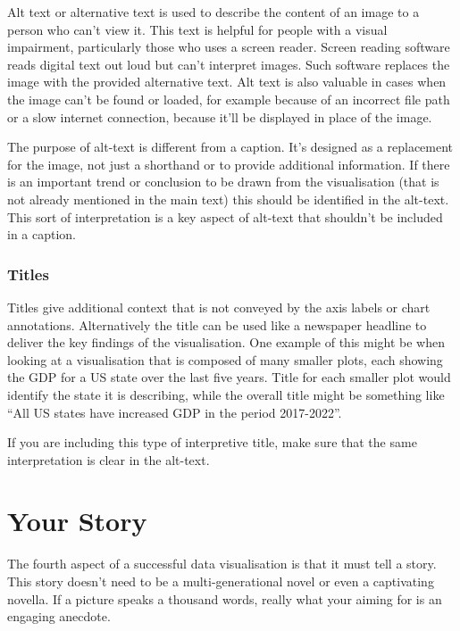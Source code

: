 \documentclass[
  12pt,
]{book}
\begin{document}
Alt text or alternative text is used to describe the content of an image to a person who can't view it. This text is helpful for people with a visual impairment, particularly those who uses a screen reader. Screen reading software reads digital text out loud but can't interpret images. Such software replaces the image with the provided alternative text. Alt text is also valuable in cases when the image can't be found or loaded, for example because of an incorrect file path or a slow internet connection, because it'll be displayed in place of the image.

The purpose of alt-text is different from a caption. It's designed as a replacement for the image, not just a shorthand or to provide additional information. If there is an important trend or conclusion to be drawn from the visualisation (that is not already mentioned in the main text) this should be identified in the alt-text. This sort of interpretation is a key aspect of alt-text that shouldn't be included in a caption.

\hypertarget{titles}{%
\subsubsection{Titles}\label{titles}}

Titles give additional context that is not conveyed by the axis labels or chart annotations. Alternatively the title can be used like a newspaper headline to deliver the key findings of the visualisation. One example of this might be when looking at a visualisation that is composed of many smaller plots, each showing the GDP for a US state over the last five years. Title for each smaller plot would identify the state it is describing, while the overall title might be something like ``All US states have increased GDP in the period 2017-2022''.

If you are including this type of interpretive title, make sure that the same interpretation is clear in the alt-text.

\hypertarget{your-story}{%
\section{Your Story 📖}\label{your-story}}

The fourth aspect of a successful data visualisation is that it must tell a story. This story doesn't need to be a multi-generational novel or even a captivating novella. If a picture speaks a thousand words, really what your aiming for is an engaging anecdote.
\end{document}
